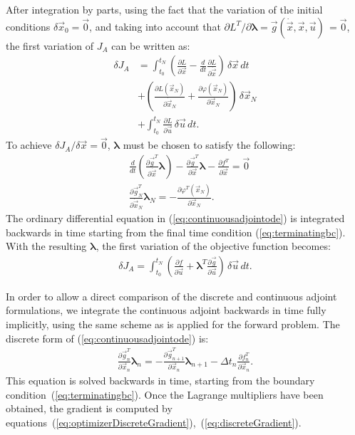 \documentclass[twocolumn,numbook]{svjour3}          %
\newcommand{\integral}[1]{\int_{t_0}^{t_N} {#1} \, dt}
\newcommand{\pder}[2]{\frac{\partial #1}{\partial #2}}
\newcommand{\dder}[2]{\frac{d #1}{d #2}}
\def\u{{\vec u}}
\def\x{{\vec x}}
\def\p{{\vec{g}}}
\def\0{{\vec 0}}
\def\blambda{{\pmb{\lambda}}}%
\def\M{{\varphi}}
\def\F{f}
\def\myobj{J}
\def\L{L}                    %
\begin{document}
After integration by parts, using the fact that the variation of the initial conditions $\delta \x_0 = \0$, and
taking into account that $\partial \L^T / \partial \blambda = \p(\dot \x, \x, \u) \, = \0$,
the first variation of $\myobj_A$ can be written as:
%
\begin{align}
\label{eq:augmentedobjective}
  \delta \myobj_A
  &= \integral{
    \left(
      \pder{\L}{\x}  -\dder{}{t} \pder{\L}{\dot{\x} }
    \right) \, \delta \x} \nonumber \\
 &+ \left ( \pder{\L(\x_N)}{\dot{\x}_N} + \pder{\M(\x_N)}{\x_N} \right )
  \, \delta \x_N \nonumber \\
  &+ \integral{ \pder{\L}{\u} \, \delta \u }.
\end{align}
%
To achieve $\delta \myobj_A / \delta \x=\0$, $\blambda$ must be chosen
to satisfy the following:
%
\begin{align}
\label{eq:continuousadjointode}
  &\dder{}{t} \left ( \pder{ \p^T }{\dot \x} \blambda \right )
    - \pder{\p^T}{\x} \blambda - \pder{\F^T}{\x} = \0
\\
\label{eq:terminatingbc}
&\pder{\p^T_N}{\dot{\x}_N} \blambda_N = -\pder{\M^T(\x_N)}{\x_N}.
\end{align}
%
The ordinary differential equation in (\ref{eq:continuousadjointode}) is integrated backwards in
time starting from the final time condition
(\ref{eq:terminatingbc}). With the resulting $\blambda$, the first variation of the objective function becomes:
\begin{align}
  \delta \myobj_A = \integral{ \left ( \pder{\F}{\u} + \blambda^T
      \pder{\p}{\u} \right ) \, \delta \u}.
\end{align}


In order to allow a direct comparison of the discrete and continuous adjoint formulations,
we integrate the continuous adjoint backwards in time fully implicitly,
using the same scheme as is applied for the forward problem. The discrete
form of (\ref{eq:continuousadjointode}) is:
\begin{align}
  \label{eq:continuousODE}
  \pder{\p^T_n}{\x_n} \blambda_n
  = -  \pder{\p^T_{n+1}}{\x_n} \blambda_{n+1} -
   \Delta t_n \pder{\F^T_n}{\x_n}.
\end{align}
This equation is solved backwards in time, starting from the boundary condition~(\ref{eq:terminatingbc}).
Once the Lagrange multipliers have been obtained, the gradient is computed by
equations~(\ref{eq:optimizerDiscreteGradient}),~(\ref{eq:discreteGradient}).  
\end{document}
